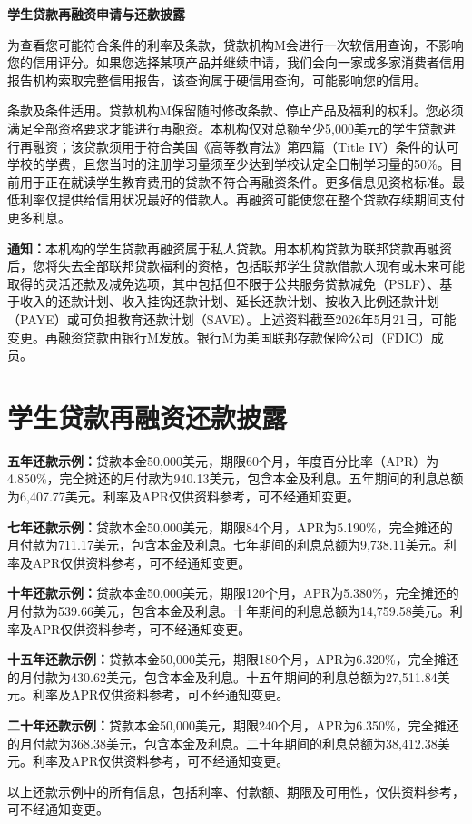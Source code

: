\documentclass[UTF8,fontset=none,11pt,a4paper]{ctexart}
\begin{document}
{\noindent\fontsize{20}{25}\selectfont\bfseries 学生贷款再融资申请与还款披露\par}
\vspace{10pt}
为查看您可能符合条件的利率及条款，贷款机构M会进行一次软信用查询，不影响您的信用评分。如果您选择某项产品并继续申请，我们会向一家或多家消费者信用报告机构索取完整信用报告，该查询属于硬信用查询，可能影响\allowbreak\mbox{您的信用。}


条款及条件适用。贷款机构M保留随时修改条款、停止产品及福利的权利。您必须满足全部资格要求才能进行再融资。本机构仅对总额至少5,000美元的学生贷款进行再融资；该贷款须用于符合美国《高等教育法》第四篇（Title IV）条件的认可学校的学费，且您当时的注册学习量须至少达到学校认定全日制学习量的50\%。目前用于正在就读学生教育费用的贷款不符合再融资条件。更多信息见资格标准。最低利率仅提供给信用状况最好的借款人。再融资可能使您在整个贷款存续期间支付更\allowbreak\mbox{多利息。}


\textbf{通知：}本机构的学生贷款再融资属于私人贷款。用本机构贷款为联邦贷款再融资后，您将失去全部联邦贷款福利的资格，包括联邦学生贷款借款人现有或未来可能取得的灵活还款及减免选项，其中包括但不限于公共服务贷款减免（PSLF）、基于收入的还款计划、收入挂钩还款计划、延长还款计划、按收入比例还款计划（PAYE）或可负担教育还款计划（SAVE）。上述资料截至2026年5月21日，可能变更。再融资贷款由银行M发放。银行M为美国联邦存款保险公司（FDIC）成员。


\section*{学生贷款再融资还款披露}
\textbf{五年还款示例：}贷款本金50,000美元，期限60个月，年度百分比率（APR）为4.850\%，完全摊还的月付款为940.13美元，包含本金及利息。五年期间的利息总额为6,407.77美元。利率及APR仅供资料参考，可不经通\allowbreak\mbox{知变更。}


\textbf{七年还款示例：}贷款本金50,000美元，期限84个月，APR为5.190\%，完全摊还的月付款为711.17美元，包含本金及利息。七年期间的利息总额为9,738.11美元。利率及APR仅供资料参考，可不经\allowbreak\mbox{通知变更。}


\textbf{十年还款示例：}贷款本金50,000美元，期限120个月，APR为5.380\%，完全摊还的月付款为539.66美元，包含本金及利息。十年期间的利息总额为14,759.58美元。利率及APR仅供资料参考，可不经\allowbreak\mbox{通知变更。}


\textbf{十五年还款示例：}贷款本金50,000美元，期限180个月，APR为6.320\%，完全摊还的月付款为430.62美元，包含本金及利息。十五年期间的利息总额为27,511.84美元。利率及APR仅供资料参考，可不经\allowbreak\mbox{通知变更。}


\textbf{二十年还款示例：}贷款本金50,000美元，期限240个月，APR为6.350\%，完全摊还的月付款为368.38美元，包含本金及利息。二十年期间的利息总额为38,412.38美元。利率及APR仅供资料参考，可不经\allowbreak\mbox{通知变更。}


以上还款示例中的所有信息，包括利率、付款额、期限及可用性，仅供资料参考，可不经\allowbreak\mbox{通知变更。}
\end{document}
